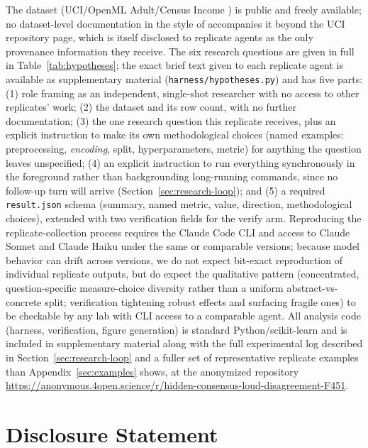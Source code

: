 \documentclass{article}
\begin{document}
The dataset (UCI/OpenML Adult/Census Income \citep{beckerkohavi1996}) is public and freely
available; no dataset-level documentation in the style of \citet{gebru2021} accompanies it
beyond the UCI repository page, which is itself disclosed to replicate agents as the only
provenance information they receive. The six research questions are given in full in
Table~\ref{tab:hypotheses}; the exact brief text given to each replicate agent is available
as supplementary material
(\texttt{harness/hypotheses.py}) and has five parts: (1) role framing as an independent,
single-shot researcher with no access to other replicates' work; (2) the dataset and its
row count, with no further documentation; (3) the one research question this replicate
receives, plus an explicit instruction to make its own methodological choices (named
examples: preprocessing, \emph{encoding}, split, hyperparameters, metric) for anything the
question leaves unspecified; (4) an explicit instruction to run everything synchronously in
the foreground rather than backgrounding long-running commands, since no follow-up turn
will arrive (Section~\ref{sec:research-loop}); and (5) a required \texttt{result.json}
schema (summary, named metric, value, direction, methodological choices), extended with
two verification
fields for the verify arm. Reproducing the replicate-collection process requires the Claude
Code CLI and access to Claude Sonnet and Claude Haiku under the same or comparable
versions; because model
behavior can drift across versions, we do not expect bit-exact reproduction of individual
replicate outputs, but do expect the qualitative pattern (concentrated, question-specific
measure-choice diversity rather than a uniform abstract-vs-concrete split; verification
tightening robust effects and surfacing fragile ones) to be checkable by any lab with CLI
access to a comparable agent. All analysis code
(harness, verification, figure generation) is standard Python/scikit-learn and is included
in supplementary material along with the full experimental log described in
Section~\ref{sec:research-loop} and a fuller set of representative replicate examples than
Appendix~\ref{sec:examples} shows, at the anonymized repository
\url{https://anonymous.4open.science/r/hidden-consensus-loud-disagreement-F451}.

\section{Disclosure Statement}
\end{document}
